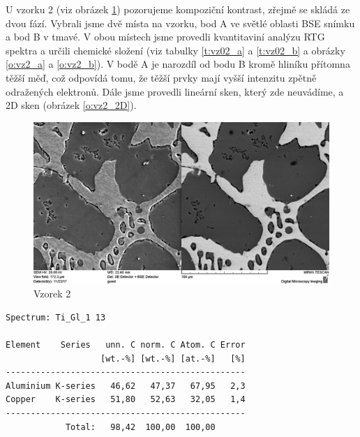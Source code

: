 U vzorku 2 (viz obrázek \ref{o:vz2_01}) pozorujeme kompoziční kontrast, zřejmě se skládá ze dvou fází. 
Vybrali jsme dvě místa na vzorku, bod A ve světlé oblasti BSE snímku a bod B v tmavé. 
V obou místech jsme provedli kvantitaviní analýzu RTG spektra a určili chemické složení (viz tabulky \ref{t:vz02_a} a \ref{t:vz02_b} a obrázky \ref{o:vz2_a} a \ref{o:vz2_b}). V bodě A je narozdíl od bodu B kromě hliníku přítomna těžší měď, což odpovídá tomu, že těžší prvky mají vyšší intenzitu zpětně odražených elektronů.
Dále jsme provedli lineární sken, který zde neuvádíme, a 2D sken (obrázek \ref{o:vz2_2D}).

\begin{figure}[htbp]
\centering
\includegraphics[width=\textwidth-2cm]{graficos/Vz02_01.png}
\caption{Vzorek 2}
\label{o:vz2_01}
\end{figure}

\begin{tabulka}[htbp]
\centering
\begin{BVerbatim}
Spectrum: Ti_Gl_1 13

Element    Series   unn. C norm. C Atom. C Error
                   [wt.-%] [wt.-%] [at.-%]   [%]
------------------------------------------------
Aluminium K-series   46,62   47,37   67,95   2,3
Copper    K-series   51,80   52,63   32,05   1,4
------------------------------------------------
            Total:   98,42  100,00  100,00
\end{BVerbatim}
\caption{Chemické složení vzorku 2 v místě A}
\label{t:vz02_a}
\end{tabulka}

